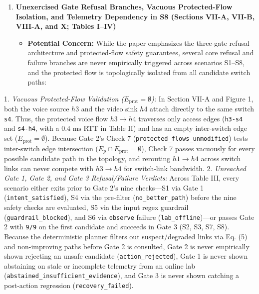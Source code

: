 \documentclass[11pt,a4paper]{article}
\begin{document}
\begin{enumerate}[leftmargin=1.6em,itemsep=3pt]
\item \textbf{Unexercised Gate Refusal Branches, Vacuous Protected-Flow Isolation, and Telemetry Dependency in S8 (Sections VII-A, VII-B, VIII-A, and X; Tables I–IV)}
\begin{itemize}[leftmargin=1.8em,itemsep=2pt]
\item \textbf{Potential Concern:} While the paper emphasizes the three-gate refusal architecture and protected-flow safety guarantees, several core refusal and failure branches are never empirically triggered across scenarios S1–S8, and the protected flow is topologically isolated from all candidate switch paths:
\end{itemize}
\end{enumerate}
1. \emph{Vacuous Protected-Flow Validation ($E_{\text{prot}} = \emptyset$):} In Section VII-A and Figure 1, both the voice source $h3$ and the video sink $h4$ attach directly to the same switch \texttt{s4}. Thus, the protected voice flow $h3 \to h4$ traverses only access edges (\texttt{h3-s4} and \texttt{s4-h4}, with a $0.4\text{ ms}$ RTT in Table II) and has an empty inter-switch edge set ($E_{\text{prot}} = \emptyset$). Because Gate 2's Check 7 (\texttt{protected\_flows\_unmodified}) tests inter-switch edge intersection ($E_p \cap E_{\text{prot}} = \emptyset$), Check 7 passes vacuously for every possible candidate path in the topology, and rerouting $h1 \to h4$ across switch links can never compete with $h3 \to h4$ for switch-link bandwidth.
2. \emph{Unreached Gate 1, Gate 2, and Gate 3 Refusal/Failure Verdicts:} Across Table III, every scenario either exits prior to Gate 2's nine checks—S1 via Gate 1 (\texttt{intent\_satisfied}), S4 via the pre-filter (\texttt{no\_better\_path}) before the nine safety checks are evaluated, S5 via the input regex guardrail (\texttt{guardrail\_blocked}), and S6 via \texttt{observe} failure (\texttt{lab\_offline})—or passes Gate 2 with \texttt{9/9} on the first candidate and succeeds in Gate 3 (S2, S3, S7, S8). Because the deterministic planner filters out suspect/degraded links via Eq. (5) and non-improving paths before Gate 2 is consulted, Gate 2 is never empirically shown rejecting an unsafe candidate (\texttt{action\_rejected}), Gate 1 is never shown abstaining on stale or incomplete telemetry from an online lab (\texttt{abstained\_insufficient\_evidence}), and Gate 3 is never shown catching a post-action regression (\texttt{recovery\_failed}).
\end{document}
